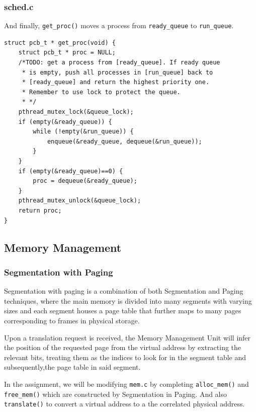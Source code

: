 \documentclass[a4paper]{article}
\numberwithin{equation}{section}
\begin{document}
\subsubsection{sched.c}

And finally, \texttt{get_proc()} moves a process from \texttt{ready_queue} to \texttt{run_queue}.
\begin{mdframed}[leftline=true,rightline=true,backgroundcolor=blue!10,nobreak=true]
  \begin{verbatim}
struct pcb_t * get_proc(void) {
	struct pcb_t * proc = NULL;
	/*TODO: get a process from [ready_queue]. If ready queue
	 * is empty, push all processes in [run_queue] back to
	 * [ready_queue] and return the highest priority one.
	 * Remember to use lock to protect the queue.
	 * */
	pthread_mutex_lock(&queue_lock);
	if (empty(&ready_queue)) {
		while (!empty(&run_queue)) {
			enqueue(&ready_queue, dequeue(&run_queue));
		}
	}
	if (empty(&ready_queue)==0) {
		proc = dequeue(&ready_queue);
	}
	pthread_mutex_unlock(&queue_lock);
	return proc;
}
  \end{verbatim}
\end{mdframed}

\subsection{Memory Management}
\subsubsection{Segmentation with Paging}
Segmentation with paging is a combination of both Segmentation and Paging techniques, where the main memory is divided into many segments with varying sizes and each segment houses a page table that further maps to many pages corresponding to frames in physical storage.

Upon a translation request is received, the Memory Management Unit will infer the position of the requested page from the virtual address by extracting the relevant bits, treating them as the indices to look for in the segment table and subsequently,the page table in said segment.

In the assignment, we will be modifying \texttt{mem.c} by completing \texttt{alloc_mem()} and \texttt{free_mem()} which are constructed by Segmentation in Paging. And also \texttt{translate()} to convert a virtual address to a the correlated physical address.
\end{document}
